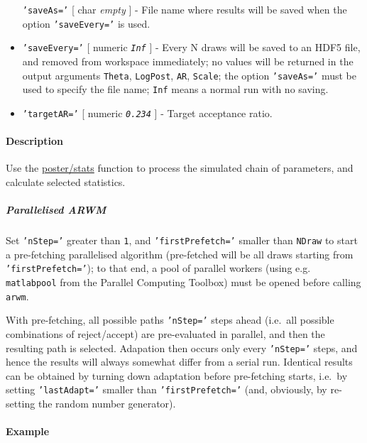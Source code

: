 \begin{itemize}
   \texttt{'saveAs='} {[} char \textbar{} \emph{empty} {]} - File name
   where results will be saved when the option \texttt{'saveEvery='} is
   used.
 \item
   \texttt{'saveEvery='} {[} numeric \textbar{} \emph{\texttt{Inf}} {]} -
   Every N draws will be saved to an HDF5 file, and removed from
   workspace immediately; no values will be returned in the output
   arguments \texttt{Theta}, \texttt{LogPost}, \texttt{AR},
   \texttt{Scale}; the option \texttt{'saveAs='} must be used to specify
   the file name; \texttt{Inf} means a normal run with no saving.
 \item
   \texttt{'targetAR='} {[} numeric \textbar{} \emph{\texttt{0.234}} {]}
   - Target acceptance ratio.
 \end{itemize}
 
 \paragraph{Description}
 
 Use the \url{poster/stats} function to process the simulated chain of
 parameters, and calculate selected statistics.
 
 \subparagraph{Parallelised ARWM}
 
 Set \texttt{'nStep='} greater than \texttt{1}, and
 \texttt{'firstPrefetch='} smaller than \texttt{NDraw} to start a
 pre-fetching parallelised algorithm (pre-fetched will be all draws
 starting from \texttt{'firstPrefetch='}); to that end, a pool of
 parallel workers (using e.g. \texttt{matlabpool} from the Parallel
 Computing Toolbox) must be opened before calling \texttt{arwm}.
 
 With pre-fetching, all possible paths \texttt{'nStep='} steps ahead
 (i.e.~all possible combinations of reject/accept) are pre-evaluated in
 parallel, and then the resulting path is selected. Adapation then occurs
 only every \texttt{'nStep='} steps, and hence the results will always
 somewhat differ from a serial run. Identical results can be obtained by
 turning down adaptation before pre-fetching starts, i.e.~by setting
 \texttt{'lastAdapt='} smaller than \texttt{'firstPrefetch='} (and,
 obviously, by re-setting the random number generator).
 
 \paragraph{Example}


